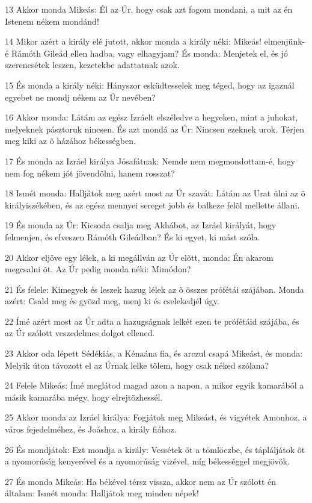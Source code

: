 \par 13 Akkor monda Mikeás: Él az Úr, hogy csak azt fogom mondani, a mit az én Istenem nékem mondánd!
\par 14 Mikor azért a király elé jutott, akkor monda a király néki: Mikeás! elmenjünk-é Rámóth Gileád ellen hadba, vagy elhagyjam? És monda: Menjetek el, és jó szerencsétek leszen, kezetekbe adattatnak azok.
\par 15 És monda a király néki: Hányszor esküdtesselek meg téged, hogy az igaznál egyebet ne mondj nékem az Úr nevében?
\par 16 Akkor monda: Látám az egész Izráelt elszéledve a hegyeken, mint a juhokat, melyeknek pásztoruk nincsen. És azt mondá az Úr: Nincsen ezeknek urok. Térjen meg kiki az õ házához békességben.
\par 17 És monda az Izráel királya Jósafátnak: Nemde nem megmondottam-é, hogy nem fog nékem jót jövendölni, hanem rosszat?
\par 18 Ismét monda: Halljátok meg azért most az Úr szavát: Látám az Urat ülni az õ királyiszékében, és az egész mennyei sereget jobb és balkeze felõl mellette állani.
\par 19 És monda az Úr: Kicsoda csalja meg Akhábot, az Izráel királyát, hogy felmenjen, és elveszen Rámóth Gileádban? És ki egyet, ki mást szóla.
\par 20 Akkor eljöve egy lélek, a ki megállván az Úr elõtt, monda: Én akarom megcsalni õt. Az Úr pedig monda néki: Mimódon?
\par 21 És felele: Kimegyek és leszek hazug lélek az õ összes prófétái szájában. Monda azért: Csald meg és gyõzd meg, menj ki és cselekedjél úgy.
\par 22 Ímé azért most az Úr adta a hazugságnak lelkét ezen te prófétáid szájába, és az Úr szólott veszedelmes dolgot ellened.
\par 23 Akkor oda lépett Sédékiás, a Kénaána fia, és arczul csapá Mikeást, és monda: Melyik úton távozott el az Úrnak lelke tõlem, hogy csak néked szólana?
\par 24 Felele Mikeás: Ímé meglátod magad azon a napon, a mikor egyik kamarából a másik kamarába mégy, hogy elrejtõzhessél.
\par 25 Akkor monda az Izráel királya: Fogjátok meg Mikeást, és vigyétek Amonhoz, a város fejedelméhez, és Joáshoz, a király fiához.
\par 26 És mondjátok: Ezt mondja a király: Vessétek õt a tömlöczbe, és tápláljátok õt a nyomorúság kenyerével és a nyomorúság vizével, míg békességgel megjövök.
\par 27 És monda Mikeás: Ha békével térsz vissza, akkor nem az Úr szólott én általam: Ismét monda: Halljátok meg minden népek!
